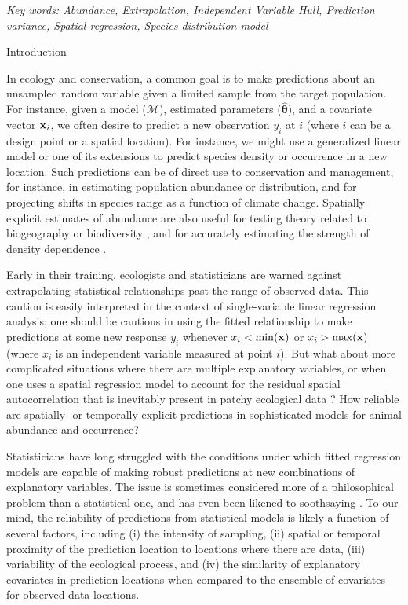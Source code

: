 \documentclass[12pt,english]{article}
\begin{document}
\begin{spacing}{1.9}
{\em Key words: Abundance, Extrapolation, Independent Variable Hull, Prediction variance, Spatial regression, Species distribution model}

\centerline{\sc Introduction}


In ecology and conservation, a common goal is to make predictions about an unsampled random variable given a limited sample from the target population.  For instance, given a model ($\mathcal{M}$), estimated parameters ($\hat{\boldsymbol{\theta}}$), and a covariate vector ${\bf x}_i$, we often desire to predict a new observation $y_i$ at $i$ (where $i$ can be a design point or a spatial location).  For instance, we might use a generalized linear model \citep[GLM;][]{McCullaghNelder1989} or one of its extensions to predict species density or occurrence in a new location.  Such predictions can be of direct use to conservation and management, for instance, in estimating population abundance or distribution, and for projecting shifts in species range as a function of climate change. Spatially explicit estimates of abundance are also useful for testing theory related to biogeography or biodiversity \citep[e.g., neutral theory;][]{Hubbell2001}, and for accurately estimating the strength of density dependence \citep{ThorsonEtAlInPress}.

Early in their training, ecologists and statisticians are warned against extrapolating statistical relationships
past the range of observed data.  This caution is easily interpreted in the context of single-variable linear regression analysis; one should be cautious in using the fitted relationship to make predictions at some new response $y_i$ whenever $x_i < \min({\bf x})$ or $x_i > \max({\bf x})$ (where $x_i$ is an independent variable measured at point $i$).  But what about more complicated situations
where there are multiple explanatory variables, or when one uses a spatial regression model to account for the residual spatial autocorrelation that is inevitably present in patchy ecological data \citep{LichsteinEtAl2002}?  How reliable are spatially- or temporally-explicit predictions in sophisticated models for animal abundance and occurrence?

Statisticians have long struggled with the conditions under which fitted regression models are capable of
making robust predictions at new combinations of explanatory variables.  The issue is sometimes considered more of a
philosophical problem than a statistical one, and has even been likened to soothsaying \citep{EhrenbergBound1993}.  To our mind, the reliability of predictions from statistical models is likely a function of several factors, including (i) the intensity of sampling,
(ii) spatial or temporal proximity of the prediction location to locations where there are data, (iii) variability of the ecological process, and (iv) the similarity of explanatory covariates in prediction locations when compared to the ensemble of covariates for observed data locations.


\end{spacing}
\end{document}
